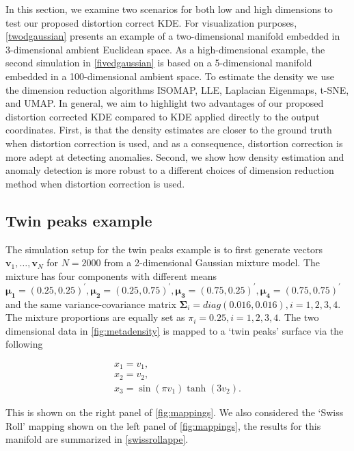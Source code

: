 \documentclass[11pt,a4paper,]{article}
\begin{document}
In this section, we examine two scenarios for both low and high dimensions to test our proposed distortion correct KDE. For visualization purposes, \autoref{twodgaussian} presents an example of a two-dimensional manifold embedded in 3-dimensional ambient Euclidean space. As a high-dimensional example, the second simulation in \autoref{fivedgaussian} is based on a 5-dimensional manifold embedded in a 100-dimensional ambient space. To estimate the density we use the dimension reduction algorithms ISOMAP, LLE, Laplacian Eigenmaps, t-SNE, and UMAP. In general, we aim to highlight two advantages of our proposed distortion corrected KDE compared to KDE applied directly to the output coordinates. First, is that the density estimates are closer to the ground truth when distortion correction is used, and as a consequence, distortion correction is more adept at detecting anomalies. Second, we show how density estimation and anomaly detection is more robust to a different choices of dimension reduction method when distortion correction is used.

\hypertarget{twodgaussian}{%
\subsection{Twin peaks example}\label{twodgaussian}}

The simulation setup for the twin peaks example is to first generate vectors \(\pmb{v}_1,\dots,\pmb{v}_N\) for \(N=2000\) from a 2-dimensional Gaussian mixture model. The mixture has four components with different means
\(\pmb{\mu_1}=(0.25, 0.25)^\prime, \pmb{\mu_2}=(0.25, 0.75)^\prime, \pmb{\mu_3}=(0.75, 0.25)^\prime, \pmb{\mu_4}=(0.75, 0.75)^\prime\) and the same variance-covariance matrix \(\pmb{\Sigma}_i=diag(0.016, 0.016), i=1,2,3,4\). The mixture proportions
are equally set as \(\pi_i=0.25, i=1,2,3,4\). The two dimensional data in \autoref{fig:metadensity} is mapped to a `twin peaks' surface via the following

\begin{equation}
\label{eq:twinpeak}
\begin{array}{lcl}
x_1 = v_1, \\
x_2 = v_2, \\
x_3 = \sin(\pi v_1) \tanh (3 v_2).
\end{array}
\end{equation}

This is shown on the right panel of \autoref{fig:mappings}. We also considered the `Swiss Roll' mapping shown on the left panel of \autoref{fig:mappings}, the results for this manifold are summarized in \autoref{swissrollappe}.
\end{document}
